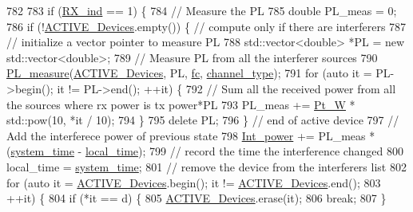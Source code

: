 \begin{DoxyCode}
{{{782 
783         \textcolor{keywordflow}{if} (\hyperlink{classAP_af5b1c2bc10a9ce9f3007bbf37f95f144}{RX\_ind} == 1) \{
784             \textcolor{comment}{// Measure the PL}
785             \textcolor{keywordtype}{double} PL\_meas = 0;
786             \textcolor{keywordflow}{if} (!\hyperlink{classAP_ab6dd8d2144b1be8dea239c3d76fc60cd}{ACTIVE\_Devices}.empty()) \{ \textcolor{comment}{// compute only if there are interferers}
787                 \textcolor{comment}{// initialize a vector pointer to measure PL}
788                 std::vector<double> *PL = \textcolor{keyword}{new} std::vector<double>;
789                 \textcolor{comment}{// Measure PL from all the interferer sources}
790                 \hyperlink{PL__measure_8cpp_afb433c5f099becf495d3c9d29ffc707d}{PL\_measure}(\hyperlink{classAP_ab6dd8d2144b1be8dea239c3d76fc60cd}{ACTIVE\_Devices}, PL, \hyperlink{classAP_af7f928faaa72cbfe5c4f905cb146a564}{fc}, 
      \hyperlink{classAP_a334f5b7be9725824797db57032de80e2}{channel\_type});
791                 \textcolor{keywordflow}{for} (\textcolor{keyword}{auto} it = PL->begin(); it != PL->end(); ++it) \{
792                     \textcolor{comment}{// Sum all the received power from all the sources where rx power is tx power*PL}
793                     PL\_meas += \hyperlink{classAP_a10998008dbe6e924211af8d9ee155534}{Pt\_W} * std::pow(10, *it / 10);
794                 \}
795                 \textcolor{keyword}{delete} PL;
796             \} \textcolor{comment}{// end of active device}
797               \textcolor{comment}{// Add the interferece power of previous state}
798             \hyperlink{classAP_a6c2c3e61c88d4bba7d949f5663b3ea10}{Int\_power} += PL\_meas * (\hyperlink{AP_8cpp_aaa03a568dc1d9d3391286ea24b9cfb63}{system\_time} - \hyperlink{classAP_ab31a52cd05ca5daf9ccd5d24941fe395}{local\_time});
799             \textcolor{comment}{// record the time the interference changed}
800             local\_time = \hyperlink{AP_8cpp_aaa03a568dc1d9d3391286ea24b9cfb63}{system\_time};
801             \textcolor{comment}{// remove the device from the interferers list}
802             \textcolor{keywordflow}{for} (\textcolor{keyword}{auto} it = \hyperlink{classAP_ab6dd8d2144b1be8dea239c3d76fc60cd}{ACTIVE\_Devices}.begin(); it != 
      \hyperlink{classAP_ab6dd8d2144b1be8dea239c3d76fc60cd}{ACTIVE\_Devices}.end();
803                     ++it) \{
804                 \textcolor{keywordflow}{if} (*it == d) \{
805                     \hyperlink{classAP_ab6dd8d2144b1be8dea239c3d76fc60cd}{ACTIVE\_Devices}.erase(it);
806                     \textcolor{keywordflow}{break};
807                 \}
}}}
\end{DoxyCode}
